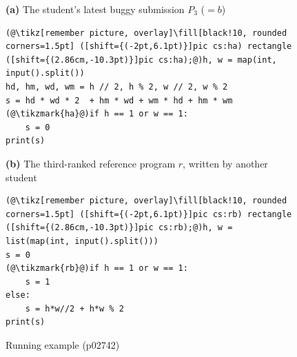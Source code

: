 \documentclass[10pt,conference]{IEEEtran}
\begin{document}
\begin{figure}[h]
\centering
\begin{minipage}{\columnwidth}
\footnotesize\textbf{(a)} The student's latest buggy submission $P_3$ ($= b$)\par\vspace{1pt}
\begin{lstlisting}
(@\tikz[remember picture, overlay]\fill[black!10, rounded corners=1.5pt] ([shift={(-2pt,6.1pt)}]pic cs:ha) rectangle ([shift={(2.86cm,-10.3pt)}]pic cs:ha);@)h, w = map(int, input().split())
hd, hm, wd, wm = h // 2, h % 2, w // 2, w % 2
s = hd * wd * 2  + hm * wd + wm * hd + hm * wm
(@\tikzmark{ha}@)if h == 1 or w == 1:
    s = 0
print(s)
\end{lstlisting}
\vspace{3pt}
\footnotesize\textbf{(b)} The third-ranked reference program $r$, written by another student\par\vspace{1pt}
\begin{lstlisting}
(@\tikz[remember picture, overlay]\fill[black!10, rounded corners=1.5pt] ([shift={(-2pt,6.1pt)}]pic cs:rb) rectangle ([shift={(2.86cm,-10.3pt)}]pic cs:rb);@)h, w = list(map(int, input().split()))
s = 0
(@\tikzmark{rb}@)if h == 1 or w == 1:
    s = 1
else:
    s = h*w//2 + h*w % 2
print(s)
\end{lstlisting}
\end{minipage}
\caption{Running example (p02742)}
\label{fig:example}
\end{figure}
\end{document}
